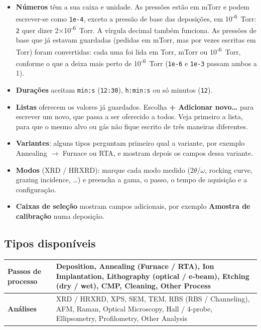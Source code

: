 \documentclass[11pt,a4paper]{article}
\newcommand{\ui}[1]{\textsf{\textbf{#1}}}
\begin{document}
\begin{itemize}
  \item \textbf{Números} têm a sua caixa e unidade. As pressões estão em
    mTorr e podem escrever-se como \texttt{1e-4}, exceto a pressão de base
    das deposições, em 10\textsuperscript{-6}~Torr: \texttt{2} quer dizer
    2×10\textsuperscript{-6}~Torr. A vírgula decimal também funciona. As
    pressões de base que já estavam guardadas (pedidas em mTorr, mas por
    vezes escritas em Torr) foram convertidas: cada uma foi lida em Torr,
    mTorr ou 10\textsuperscript{-6}~Torr, conforme o que a deixa mais perto
    de 10\textsuperscript{-6}~Torr (\texttt{1e-6} e \texttt{1e-3} passam
    ambos a 1).
  \item \textbf{Durações} aceitam \texttt{min:s} (\texttt{12:30}),
    \texttt{h:min:s} ou só minutos (\texttt{12}).
  \item \textbf{Listas} oferecem os valores já guardados. Escolha
    \ui{+ Adicionar novo\ldots} para escrever um novo, que passa a ser
    oferecido a todos. Veja primeiro a lista, para que o mesmo alvo ou gás
    não fique escrito de três maneiras diferentes.
  \item \textbf{Variantes}: alguns tipos perguntam primeiro qual a variante,
    por exemplo Annealing $\to$ Furnace ou RTA, e mostram depois os campos
    dessa variante.
  \item \textbf{Modos} (XRD / HRXRD): marque cada modo medido
    (2$\theta$/$\omega$, rocking curve, grazing incidence, \ldots) e
    preencha a gama, o passo, o tempo de aquisição e a configuração.
  \item \textbf{Caixas de seleção} mostram campos adicionais, por exemplo
    \ui{Amostra de calibração} numa deposição.
\end{itemize}

\subsection{Tipos disponíveis}
\label{sec:types}

\begin{center}
\begin{tabularx}{\linewidth}{@{}lX@{}}
\toprule
\textbf{Passos de processo} & Deposition, Annealing (Furnace / RTA), Ion
  Implantation, Lithography (optical / e-beam), Etching (dry / wet), CMP, Cleaning, Other Process \\
\midrule
\textbf{Análises} & XRD / HRXRD, XPS, SEM, TEM, RBS (RBS / Channeling),
  AFM, Raman, Optical Microscopy, Hall / 4-probe, Ellipsometry,
  Profilometry, Other Analysis \\
\bottomrule
\end{tabularx}
\end{center}
\end{document}
